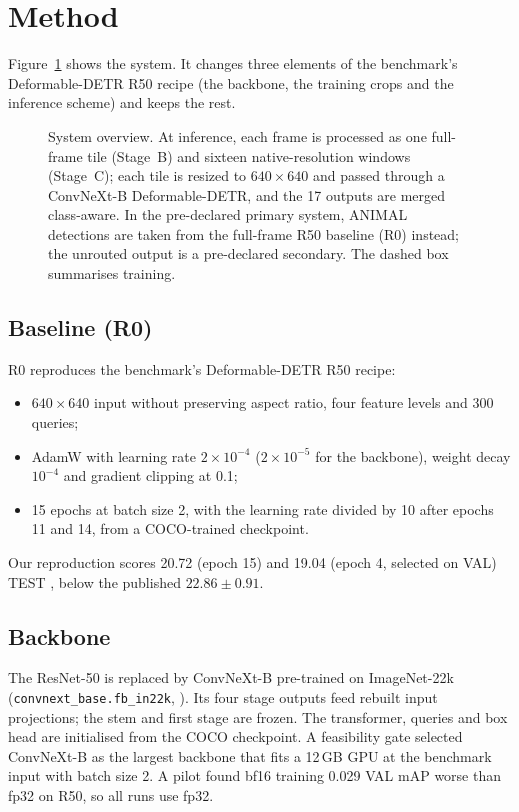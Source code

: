 \section{Method}\label{sec:method}

Figure~\ref{fig:arch} shows the system. It changes three elements of the benchmark's Deformable-DETR R50 recipe (the backbone, the training crops and the inference scheme) and keeps the rest.

\begin{figure}[t]
\centering
\resizebox{\textwidth}{!}{}
\caption{System overview. At inference, each frame is processed as one full-frame tile (Stage~B) and sixteen native-resolution windows (Stage~C); each tile is resized to $640\times640$ and passed through a ConvNeXt-B Deformable-DETR, and the 17 outputs are merged class-aware. In the pre-declared primary system, ANIMAL detections are taken from the full-frame R50 baseline (R0) instead; the unrouted output is a pre-declared secondary. The dashed box summarises training.}
\label{fig:arch}
\end{figure}

\subsection{Baseline (R0)}
R0 reproduces the benchmark's Deformable-DETR R50 recipe:
\begin{itemize}
\item $640 \times 640$ input without preserving aspect ratio, four feature levels and 300 queries;
\item AdamW with learning rate $2\times10^{-4}$ ($2\times10^{-5}$ for the backbone), weight decay $10^{-4}$ and gradient clipping at 0.1;
\item 15 epochs at batch size 2, with the learning rate divided by 10 after epochs 11 and 14, from a COCO-trained checkpoint.
\end{itemize}
Our reproduction scores 20.72 (epoch 15) and 19.04 (epoch 4, selected on VAL) TEST \mapthree{}, below the published $22.86 \pm 0.91$.

\subsection{Backbone}
The ResNet-50 is replaced by ConvNeXt-B pre-trained on ImageNet-22k (\texttt{convnext\_base.fb\_in22k}, \citep{liu2022convnext,wightman2019timm}). Its four stage outputs feed rebuilt input projections; the stem and first stage are frozen. The transformer, queries and box head are initialised from the COCO checkpoint. A feasibility gate selected ConvNeXt-B as the largest backbone that fits a 12\,GB GPU at the benchmark input with batch size 2. A pilot found bf16 training 0.029 VAL mAP worse than fp32 on R50, so all runs use fp32.

